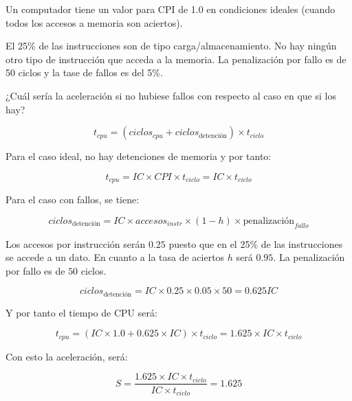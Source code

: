 \begin{acexercise}\end{acexercise}

Un computador tiene un valor para CPI de 1.0 en condiciones ideales
(cuando todos los accesos a memoria son aciertos).

El 25\% de las instrucciones son de tipo carga/almacenamiento.
No hay ningún otro tipo de instrucción que acceda a la memoria.
La penalización por fallo es de 50 ciclos y la tase de fallos 
es del 5\%.

¿Cuál sería la aceleración si no hubiese fallos con respecto al
caso en que si los hay?

\begin{acsolution}\end{acsolution}

\[
t_{cpu} = (ciclos_{cpu} + ciclos_{\text{detención}}) \times t_{ciclo}
\]

Para el caso ideal, no hay detenciones de memoria y por tanto:

\[
t_{cpu} = IC \times CPI \times t_{ciclo} =
IC \times t_{ciclo}
\]

Para el caso con fallos, se tiene:

\[
ciclos_{\text{detención}} =
IC \times accesos_{instr} \times (1 - h) \times \text{penalización}_{fallo}
\]

Los accesos por instrucción serán $0.25$ puesto que
en el 25\% de las instrucciones se accede a un dato. En cuanto a la tasa de
aciertos $h$ será $0.95$. La penalización por fallo es de $50$ ciclos.

\[
ciclos_{\text{detención}} =
IC \times 0.25 \times 0.05 \times 50 =
0.625 IC
\]

Y por tanto el tiempo de CPU será:

\[
t_{cpu} = (IC \times 1.0 + 0.625 \times IC) \times t_{ciclo} =
1.625 \times IC \times t_{ciclo}
\]

Con esto la aceleración, será:

\[
S = \frac{1.625 \times IC \times t_{ciclo}}{IC \times t_{ciclo}} = 1.625
\]
